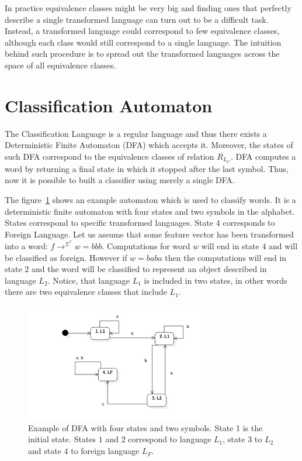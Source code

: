 \documentclass{mini}
\newcommand{\featureTransformationWord}[1]{
    \rightarrow^{#1^{*}}
}
\begin{document}
In practice equivalence classes might be very big and finding ones that perfectly describe a single transformed language can turn out to be a difficult task. Instead, a transformed language could correspond to few equivalence classes, although each class would still correspond to a single language. The intuition behind such procedure is to spread out the transformed languages across the space of all equivalence classes.

\section{Classification Automaton}\label{sec:lan_theory_class_lan_dfa}

The Classification Language is a regular language and thus there exists a Deterministic Finite Automaton (DFA) which accepts it. Moreover, the states of such DFA correspond to the equivalence classes of relation $R_{L_{C}}$. DFA computes a word by returning a final state in which it stopped after the last symbol. Thus, now it is possible to built a classifier using merely a single DFA.

The figure~\ref{fig:class_dfa} shows an example automaton which is used to classify words. It is a deterministic finite automaton with four states and two symbols in the alphabet. States correspond to specific transformed languages. State $4$ corresponds to Foreign Language. Let us assume that some feature vector has been transformed into a word: $f \featureTransformationWord{\Sigma} w = bbb$. Computations for word $w$ will end in state $4$ and will be classified as foreign. However if $w = baba$ then the computations will end in state $2$ and the word will be classified to represent an object described in language $L_2$. Notice, that language $L_1$ is included in two states, in other words there are two equivalence classes that include $L_1$.

\begin{figure}[H]
    \centering
    \includegraphics[width=0.7\textwidth]{../uml/states/dfa.jpg}
    \caption{Example of DFA with four states and two symbols. State 1 is the initial state. States $1$ and $2$ correspond to language $L_{1}$, state $3$ to $L_2$ and state $4$ to foreign language $L_F$.}
    \label{fig:class_dfa}
\end{figure}
\end{document}
